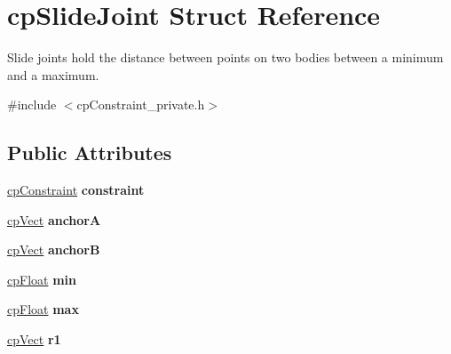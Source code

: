 \hypertarget{structcp_slide_joint}{}\section{cp\+Slide\+Joint Struct Reference}
\label{structcp_slide_joint}


Slide joints hold the distance between points on two bodies between a minimum and a maximum.  




{\ttfamily \#include $<$cp\+Constraint\+\_\+private.\+h$>$}

\subsection*{Public Attributes}
\begin{DoxyCompactItemize}
\item 
\hypertarget{structcp_slide_joint_ac176118fb1e3c608502e2c38b681299b}{}\hyperlink{structcp_constraint}{cp\+Constraint} {\bfseries constraint}\label{structcp_slide_joint_ac176118fb1e3c608502e2c38b681299b}

\item 
\hypertarget{structcp_slide_joint_ab4a47facc1b3b5159556acdb49da1f0c}{}\hyperlink{structcp_vect}{cp\+Vect} {\bfseries anchor\+A}\label{structcp_slide_joint_ab4a47facc1b3b5159556acdb49da1f0c}

\item 
\hypertarget{structcp_slide_joint_a3b2651bb23758311d692f4c8723967bb}{}\hyperlink{structcp_vect}{cp\+Vect} {\bfseries anchor\+B}\label{structcp_slide_joint_a3b2651bb23758311d692f4c8723967bb}

\item 
\hypertarget{structcp_slide_joint_ab09e70408e21a6ec3876ec0bb8e0df3d}{}\hyperlink{group__basic_types_gac1ed65573e035bf892505768c852d8d3}{cp\+Float} {\bfseries min}\label{structcp_slide_joint_ab09e70408e21a6ec3876ec0bb8e0df3d}

\item 
\hypertarget{structcp_slide_joint_a64e7a5318a380a89e4b2d4f415149a3e}{}\hyperlink{group__basic_types_gac1ed65573e035bf892505768c852d8d3}{cp\+Float} {\bfseries max}\label{structcp_slide_joint_a64e7a5318a380a89e4b2d4f415149a3e}

\item 
\hypertarget{structcp_slide_joint_a0e9f6d561515fce715ed9e9b47a6ac18}{}\hyperlink{structcp_vect}{cp\+Vect} {\bfseries r1}\label{structcp_slide_joint_a0e9f6d561515fce715ed9e9b47a6ac18}


\end{DoxyCompactItemize}
